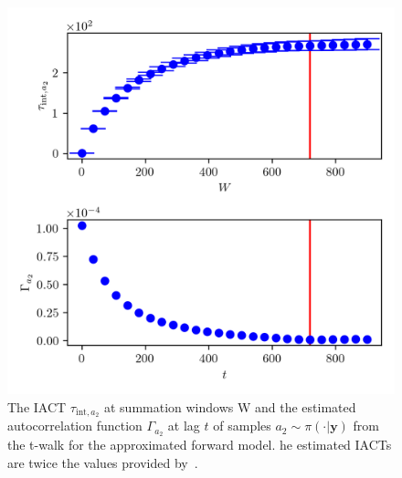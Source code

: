 \begin{figure}[ht!]
	\centering
	\includegraphics{UwerrTauIntTWalk10.png}
	\caption[IACT and autocorrelation function of samples $a_2 \sim \pi(\cdot|\bm{y})$, for approximated model.]{The IACT $\tau_{\text{int},a_2}$ at summation windows W and the estimated autocorrelation function $\Gamma_{a_2}$ at lag $t$ of samples $a_2 \sim \pi( \cdot | \bm{y})$ from the t-walk for the approximated forward model.
		he estimated IACTs are twice the values provided by~\cite{drikHesse, UwerrM}.}
	\label{fig:TWalkIATC11}
\end{figure}


